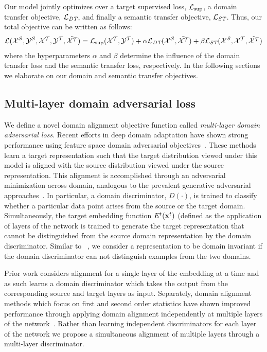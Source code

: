 Our model jointly optimizes over a target supervised loss, $\mathcal{L}_{\text{sup}}$, a domain transfer objective, $\mathcal{L}_{\textit{DT}}$, and finally a semantic transfer objective, $\mathcal{L}_{\textit{ST}}$. Thus, our total objective can be written as follows:
\begin{eqnarray}
	\mathcal{L}(\mathcal{X}^{\mathcal{S}}, \mathcal{Y}^{\mathcal{S}}, \mathcal{X}^{\mathcal{T}}, \mathcal{Y}^{\mathcal{T}}, \tilde{\mathcal{X}^{\mathcal{T}}}) =
    		\mathcal{L}_{\text{sup}}(\mathcal{X}^{\mathcal{T}}, \mathcal{Y}^{\mathcal{T}}) + \alpha \mathcal{L}_{\textit{DT}}(\mathcal{X}^{\mathcal{S}}, \tilde{\mathcal{X}^{\mathcal{T}}})
            + \beta \mathcal{L}_{\textit{ST}}(\mathcal{X}^{\mathcal{S}}, \mathcal{X}^{\mathcal{T}}, \tilde{\mathcal{X}^{\mathcal{T}}})
\end{eqnarray}
where the hyperparameters $\alpha$ and $\beta$ determine the influence of the domain transfer loss and the semantic transfer loss, respectively. In the following sections we elaborate on our domain and semantic transfer objectives.

\subsection{Multi-layer domain adversarial loss}
We define a novel domain alignment objective function called \textit{multi-layer domain adversarial loss}.
Recent efforts in deep domain adaptation have shown strong performance using feature space domain adversarial objectives~\cite{ganin2016domain,tzeng2017adversarial}. These methods learn a target representation such that the target distribution viewed under this model is aligned with the source distribution viewed under the source representation. This alignment is accomplished through an adversarial minimization across domain, analogous to the prevalent generative adversarial approaches~\cite{goodfellow2014generative}. In particular, a domain discriminator, $D(\cdot)$, is trained to classify whether a particular data point arises from the source or the target domain. Simultaneously,
the target embedding function $E^{t}(\mathbf{x}^{t})$ (defined as the application of layers of the network is trained to generate the target representation that cannot be distinguished from the source domain representation by the domain discriminator. Similar to ~\cite{Tzeng_ICCV2015,tzeng2017adversarial}, we consider a representation to be domain invariant if the domain discriminator can not distinguish examples from the two domains.  

Prior work considers alignment for a single layer of the embedding at a time and as such learns a domain discriminator which takes the output from the corresponding source and target layers as input. Separately, domain alignment methods which focus on first and second order statistics have shown improved performance through applying domain alignment independently at multiple layers of the network~\cite{long2015learning}. Rather than learning independent discriminators for each layer of the network we propose a simultaneous alignment of multiple layers through a multi-layer discriminator.

